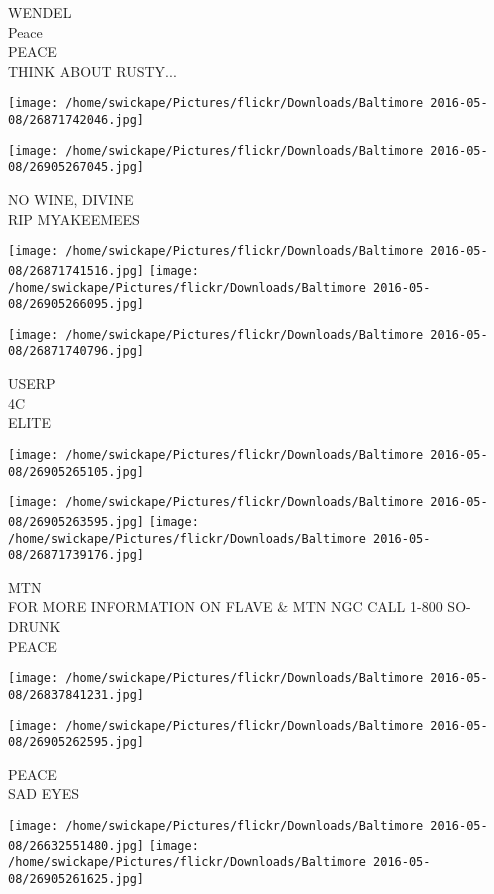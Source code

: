 \documentclass[10pt,letterpaper]{article}
\begin{document}
WENDEL\\
Peace\\
PEACE\\
THINK ABOUT RUSTY...
\pagebreak

\texttt{[image: /home/swickape/Pictures/flickr/Downloads/Baltimore 2016-05-08/26871742046.jpg]}

\vspace{0.25in}
\texttt{[image: /home/swickape/Pictures/flickr/Downloads/Baltimore 2016-05-08/26905267045.jpg]}

NO WINE, DIVINE\\
RIP MYAKEEMEES
\pagebreak

\texttt{[image: /home/swickape/Pictures/flickr/Downloads/Baltimore 2016-05-08/26871741516.jpg]}
\texttt{[image: /home/swickape/Pictures/flickr/Downloads/Baltimore 2016-05-08/26905266095.jpg]}

\texttt{[image: /home/swickape/Pictures/flickr/Downloads/Baltimore 2016-05-08/26871740796.jpg]}

USERP\\
4C\\
ELITE
\pagebreak

\texttt{[image: /home/swickape/Pictures/flickr/Downloads/Baltimore 2016-05-08/26905265105.jpg]}

\vspace{0.25in}
\texttt{[image: /home/swickape/Pictures/flickr/Downloads/Baltimore 2016-05-08/26905263595.jpg]}
\texttt{[image: /home/swickape/Pictures/flickr/Downloads/Baltimore 2016-05-08/26871739176.jpg]}

MTN\\
FOR MORE INFORMATION ON FLAVE \& MTN NGC CALL 1{-}800 SO{-}DRUNK\\
PEACE
\pagebreak

\texttt{[image: /home/swickape/Pictures/flickr/Downloads/Baltimore 2016-05-08/26837841231.jpg]}

\vspace{0.25in}
\texttt{[image: /home/swickape/Pictures/flickr/Downloads/Baltimore 2016-05-08/26905262595.jpg]}

PEACE\\
SAD EYES
\pagebreak

\texttt{[image: /home/swickape/Pictures/flickr/Downloads/Baltimore 2016-05-08/26632551480.jpg]}
\texttt{[image: /home/swickape/Pictures/flickr/Downloads/Baltimore 2016-05-08/26905261625.jpg]}
\end{document}
